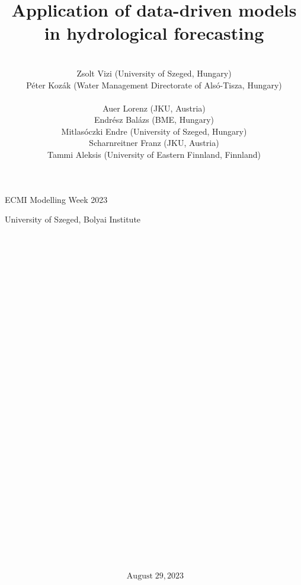 \documentclass{article}
\newcommand{\tmaffiliation}[1]{\\ #1}
\newcommand{\tmop}[1]{\ensuremath{\operatorname{#1}}}
\begin{document}

ECMI Modelling Week 2023

University of Szeged, Bolyai Institute

\

\

\

\title{Application of data-driven models in hydrological forecasting}

\author{
  
  \tmaffiliation{Zsolt Vizi (University of Szeged, Hungary)\\
  P{\'e}ter Koz{\'a}k (Water Management Directorate of Als{\'o}-Tisza,
  Hungary)\\
  \\
  Auer Lorenz (JKU, Austria)\\
  Endr{\'e}sz Bal{\'a}zs (BME, Hungary)\\
  Mitlas{\'o}czki Endre (University of Szeged, Hungary)\\
  Scharnreitner Franz (JKU, Austria)\\
  Tammi Aleksis (University of Eastern Finnland, Finnland)}
}

\maketitle

\

\

\

\

\

\

\

\

\

\

\

\

\

\


\[ \tmop{August} 29, 2023 \]
{\newpage}

{\tableofcontents}

{\newpage}
\end{document}
